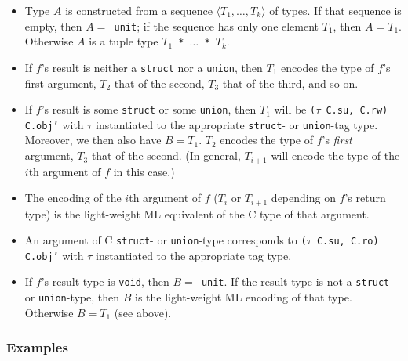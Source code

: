 \documentclass[titlepage,letterpaper]{article}
\begin{document}
\begin{itemize}
\item Type $A$ is constructed from a sequence $\langle T_1, \ldots,
  T_k \rangle$ of types.  If that sequence is empty, then {\tt $A =$
    unit}; if the sequence has only one element $T_1$, then $A = T_1$.
  Otherwise $A$ is a tuple type {\tt $T_1$ * $\ldots$ * $T_k$}.
\item If $f$'s result is neither a {\tt struct} nor a {\tt union},
  then $T_1$ encodes the type of $f$'s first argument, $T_2$ that of
  the second, $T_3$ that of the third, and so on.
\item If $f$'s result is some {\tt struct} or some {\tt union}, then
  $T_1$ will be {\tt ($\tau$ C.su, C.rw) C.obj'} with $\tau$
  instantiated to the appropriate {\tt struct}- or {\tt union}-tag
  type.  Moreover, we then also have $B = T_1$. $T_2$ encodes the type
  of $f$'s {\em first} argument, $T_3$ that of the second.  (In
  general, $T_{i+1}$ will encode the type of the $i$th argument of
  $f$ in this case.)
\item The encoding of the $i$th argument of $f$ ($T_i$ or $T_{i+1}$
  depending on $f$'s return type) is the light-weight ML equivalent of
  the C type of that argument.
\item An argument of C {\tt struct}- or {\tt union}-type corresponds
  to {\tt ($\tau$ C.su, C.ro) C.obj'} with $\tau$ instantiated to the
  appropriate tag type.
\item If $f$'s result type is {\tt void}, then {\tt $B =$ unit}.  If
  the result type is not a {\tt struct}- or {\tt union}-type, then $B$
  is the light-weight ML encoding of that type.  Otherwise $B = T_1$
  (see above).
\end{itemize}

\subsubsection*{Examples}
\end{document}
